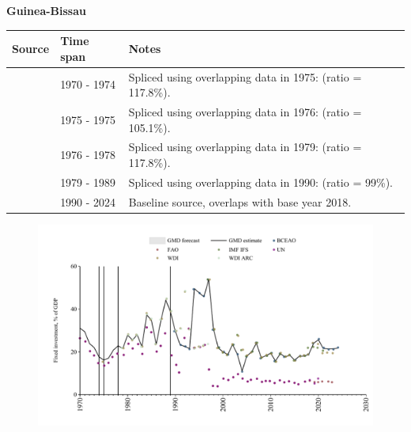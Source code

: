\documentclass[12pt,a4paper,landscape]{article}
\begin{document}
\begin{adjustbox}{max totalsize={\paperwidth}{\paperheight},center}
\begin{minipage}[t][\textheight][t]{\textwidth}
\vspace*{0.5cm}
{}
\begin{center}
{\Large\bfseries Guinea-Bissau}
\end{center}
\vspace{0.5cm}
\begin{table}[H]
\centering
\small
\begin{tabular}{|l|l|l|}
\hline
\textbf{Source} & \textbf{Time span} & \textbf{Notes} \\
\hline
\rowcolor{white}\cite{UN}& 1970 - 1974 &Spliced using overlapping data in 1975: (ratio = 117.8\%).\\
\rowcolor{lightgray}\cite{WDI}& 1975 - 1975 &Spliced using overlapping data in 1976: (ratio = 105.1\%).\\
\rowcolor{white}\cite{UN}& 1976 - 1978 &Spliced using overlapping data in 1979: (ratio = 117.8\%).\\
\rowcolor{lightgray}\cite{WDI}& 1979 - 1989 &Spliced using overlapping data in 1990: (ratio = 99\%).\\
\rowcolor{white}\cite{BCEAO}& 1990 - 2024 &Baseline source, overlaps with base year 2018.\\
\hline
\end{tabular}
\end{table}
\begin{figure}[H]
\centering
\includegraphics[width=\textwidth,height=0.6\textheight,keepaspectratio]{graphs/GNB_finv_GDP.pdf}
\end{figure}
\end{minipage}
\end{adjustbox}
\end{document}
